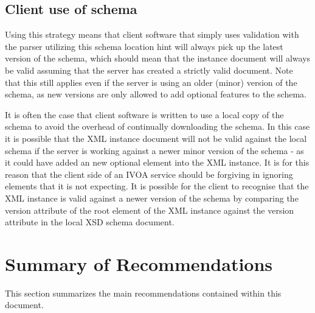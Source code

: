 \documentclass[10pt,a4paper]{ivoa}
\begin{document}
\subsection{Client use of schema}
Using this strategy means that client software that simply uses validation with
the parser utilizing this schema location hint will always pick up the latest
version of the schema, which should mean that the instance document will always
be valid assuming that the server has created a strictly valid document. Note
that this still applies even if the server is using an older (minor) version of
the schema, as new versions are only allowed to add optional features to the
schema.

It is often the case that client software is written to use a local copy of the
schema to avoid the overhead of continually downloading the schema. In this case
it is possible that the XML instance document will not be valid against the
local schema if the server is working against a newer minor version of the
schema - as it could have added an new optional element into the XML instance.
It is for this reason that the client side of an IVOA service should be
forgiving in ignoring elements that it is not expecting. It is possible for the
client to recognise that the XML instance is valid against a newer version of
the schema by comparing the version attribute of the root element of the XML
instance against the version attribute in the local XSD schema document.

\section{Summary of Recommendations}
This section summarizes the main recommendations contained within this document.
\end{document}
